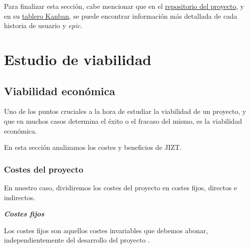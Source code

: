 Para finalizar esta sección, cabe mencionar que en el \href{https://github.com/dmlls/jizt/milestones}{repositorio del proyecto}, y en su \href{https://board.jizt.it/public/board/c08ea3322e2876652a0581e79d6430e2dc0c27720d8a06d7853e84c3cd2b}{tablero Kanban}, se puede encontrar información más detallada de cada historia de usuario y \emph{epic}.

\newpage

\section{Estudio de viabilidad}

\subsection{Viabilidad económica}

Uno de los puntos cruciales a la hora de estudiar la viabilidad de un proyecto, y que en muchos casos determina el éxito o el fracaso del mismo, es la viabilidad económica.

En esta sección analizamos los costes y beneficios de JIZT.


\subsubsection{Costes del proyecto}

En nuestro caso, dividiremos los costes del proyecto en costes fijos, directos e indirectos.

\vspace{0.4cm}
\noindent
\textbf{\emph{Costes fijos}}

Los costes fijos son aquellos costes invariables que debemos abonar, independientemente del desarrollo del proyecto \cite{perez18}.

